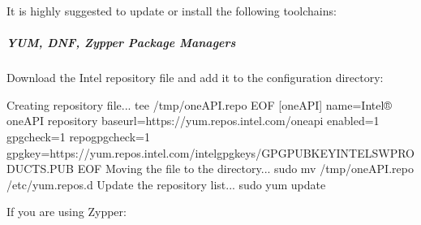 \documentclass[letterpaper,11pt,english]{sphinxmanual}
\begin{document}
\sphinxAtStartPar
It is highly suggested to update or install the following toolchains:

\begin{sphinxVerbatim}[commandchars=\\\{\}]
  
     
\end{sphinxVerbatim}


\subparagraph{YUM, DNF, Zypper Package Managers}
\label{\detokenize{technical/installation/orbfit:yum-dnf-zypper-package-managers}}
\sphinxAtStartPar
Download the Intel repository file and add it to the configuration directory:

\begin{sphinxVerbatim}[commandchars=\\\{\}]
\PYGZsh{} Creating repository file...
tee \PYGZgt{} /tmp/oneAPI.repo \PYGZlt{}\PYGZlt{} EOF
[oneAPI]
name=Intel® oneAPI repository
baseurl=https://yum.repos.intel.com/oneapi
enabled=1
gpgcheck=1
repo\PYGZus{}gpgcheck=1
gpgkey=https://yum.repos.intel.com/intel\PYGZhy{}gpg\PYGZhy{}keys/GPG\PYGZhy{}PUB\PYGZhy{}KEY\PYGZhy{}INTEL\PYGZhy{}SW\PYGZhy{}PRODUCTS.PUB
EOF
\PYGZsh{} Moving the file to the directory...
sudo mv /tmp/oneAPI.repo /etc/yum.repos.d
\PYGZsh{} Update the repository list...
sudo yum update
\end{sphinxVerbatim}

\sphinxAtStartPar
If you are using Zypper:

\begin{sphinxVerbatim}[commandchars=\\\{\}]
    
  
  
\end{sphinxVerbatim}
\end{document}
